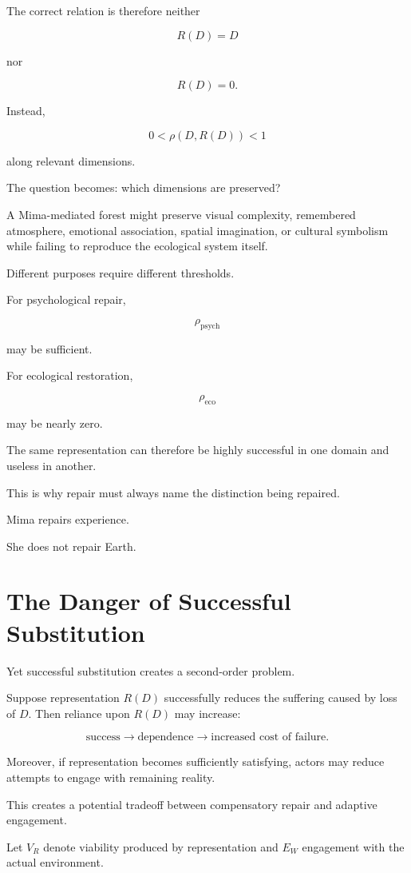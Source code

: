 \documentclass[11pt,oneside]{book}
\theoremstyle{definition}
\theoremstyle{remark}
\begin{document}
The correct relation is therefore neither

\[
R(D)=D
\]

nor

\[
R(D)=0.
\]

Instead,

\[
0<\rho(D,R(D))<1
\]

along relevant dimensions.

The question becomes: which dimensions are preserved?

A Mima-mediated forest might preserve visual complexity, remembered atmosphere, emotional association, spatial imagination, or cultural symbolism while failing to reproduce the ecological system itself.

Different purposes require different thresholds.

For psychological repair,

\[
\rho_{\mathrm{psych}}
\]

may be sufficient.

For ecological restoration,

\[
\rho_{\mathrm{eco}}
\]

may be nearly zero.

The same representation can therefore be highly successful in one domain and useless in another.

This is why repair must always name the distinction being repaired.

Mima repairs experience.

She does not repair Earth.

\section{The Danger of Successful Substitution}

Yet successful substitution creates a second-order problem.

Suppose representation \(R(D)\) successfully reduces the suffering caused by loss of \(D\). Then reliance upon \(R(D)\) may increase:

\[
\text{success}
\rightarrow
\text{dependence}
\rightarrow
\text{increased cost of failure}.
\]

Moreover, if representation becomes sufficiently satisfying, actors may reduce attempts to engage with remaining reality.

This creates a potential tradeoff between compensatory repair and adaptive engagement.

Let \(V_R\) denote viability produced by representation and \(E_W\) engagement with the actual environment.
\end{document}
